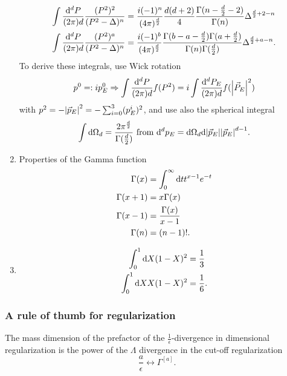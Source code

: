 \begin{enumerate}
\begin{align}
	\int \frac{\mathrm{d}^dP}{(2\pi) d} \frac{(P^2)^2}{(P^2-\Delta)^n} &= \frac{i(-1)^n}{(4 \pi)^{\frac{d}{2}}} \frac{d(d+2)}{4} \frac{\Gamma(n-\frac{d}{2} -2)}{\Gamma(n)} \Delta^{\frac{d}{2}+2-n} \\
	\int \frac{\mathrm{d}^dP}{(2\pi) d} \frac{(P^2)^a}{(P^2-\Delta)^n} &= \frac{i(-1)^b}{(4 \pi)^\frac{d}{2}} \frac{\Gamma(b-a-\frac{d}{2}) \Gamma(a+\frac{d}{2})}{\Gamma(n) \Gamma(\frac{d}{2})} \Delta^{\frac{d}{2}+a-n}.
	\end{align}
	To derive these integrals, use Wick rotation
	\begin{equation}
	p^0 =: i p^0_E \Rightarrow \int \frac{\mathrm{d}^dP}{(2\pi) d} f(P^2) = i \int \frac{\mathrm{d}^dP_E}{(2\pi) d} f(\abs{\vec{P}_E}^2)
	\end{equation}
	with $p^2=-\abs{\vec{p}_E}^2=-\sum_{i=0}^{3} (p^i_E)^2$, and use also the spherical integral
	\begin{equation}
	\int \mathrm{d} \Omega_d = \frac{2 \pi^\frac{d}{2}}{\Gamma(\frac{d}{2})} \text{ from } \mathrm{d}^d p_E = \mathrm{d} \Omega_d \mathrm{d} \abs{\vec{p}_E} \abs{\vec{p}_E}^{d-1}.
	\end{equation}
	\item Properties of the Gamma function
	\begin{align}
	\Gamma(x) &= \int_0^\infty \mathrm{d} t t^{x-1} e^{-t} \\
	\Gamma(x+1) &= x \Gamma(x) \\
	\Gamma(x-1) &= \frac{\Gamma(x)}{x-1}\\
	\Gamma(n) &= (n-1)!.
	\end{align}
	\item 
	\begin{align}
	\int_0^1 \mathrm{d} X (1-X)^2 &=\frac{1}{3} \\
	\int_0^1 \mathrm{d} X X(1-X)^2 &=\frac{1}{6}.
	\end{align}
\end{enumerate}
\subsubsection{A rule of thumb for regularization}
The mass dimension of the prefactor of the $\frac{1}{\epsilon}$-divergence in dimensional regularization is the power of the  $\Lambda$ divergence in the cut-off regularization
\begin{equation}
\frac{a}{\epsilon} \leftrightarrow \Gamma^{[a]}.
\end{equation}

